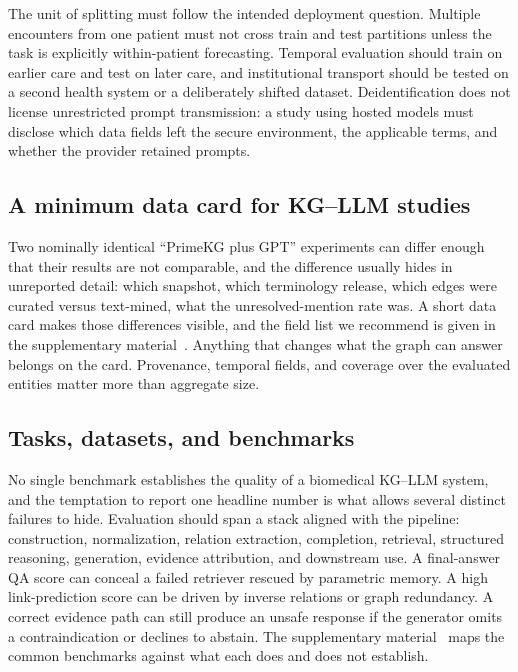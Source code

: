 The unit of splitting must follow the intended deployment question. Multiple encounters from one patient must not cross train and test partitions unless the task is explicitly within-patient forecasting. Temporal evaluation should train on earlier care and test on later care, and institutional transport should be tested on a second health system or a deliberately shifted dataset. Deidentification does not license unrestricted prompt transmission: a study using hosted models must disclose which data fields left the secure environment, the applicable terms, and whether the provider retained prompts.

\subsection{A minimum data card for KG--LLM studies}

Two nominally identical ``PrimeKG plus GPT'' experiments can differ enough that their results are not comparable, and the difference usually hides in unreported detail: which snapshot, which terminology release, which edges were curated versus text-mined, what the unresolved-mention rate was. A short data card makes those differences visible, and the field list we recommend is given in the supplementary material~\cite{supplementary}. Anything that changes what the graph can answer belongs on the card. Provenance, temporal fields, and coverage over the evaluated entities matter more than aggregate size.

\subsection{Tasks, datasets, and benchmarks}

No single benchmark establishes the quality of a biomedical KG--LLM system, and the temptation to report one headline number is what allows several distinct failures to hide. Evaluation should span a stack aligned with the pipeline: construction, normalization, relation extraction, completion, retrieval, structured reasoning, generation, evidence attribution, and downstream use. A final-answer QA score can conceal a failed retriever rescued by parametric memory. A high link-prediction score can be driven by inverse relations or graph redundancy. A correct evidence path can still produce an unsafe response if the generator omits a contraindication or declines to abstain. The supplementary material~\cite{supplementary} maps the common benchmarks against what each does and does not establish.

